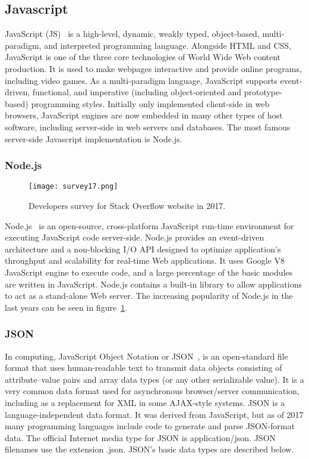 \subsection{Javascript}
JavaScript (JS)~\cite{crockford2008javascript} is a high-level, dynamic, weakly typed, object-based, multi-paradigm, and interpreted programming language. Alongside HTML and CSS, JavaScript is one of the three core technologies of World Wide Web content production. It is used to make webpages interactive and provide online programs, including video games. As a multi-paradigm language, JavaScript supports event-driven, functional, and imperative (including object-oriented and prototype-based) programming styles. Initially only implemented client-side in web browsers, JavaScript engines are now embedded in many other types of host software, including server-side in web servers and databases. The most famous server-side Javascript implementation is Node.js.

\subsubsection{Node.js}
\begin{figure}
	\centerline{\texttt{[image: survey17.png]}}
	\caption{Developers survey for Stack Overflow website in 2017.}
	\label{survey17}
\end{figure}
Node.js~\cite{tilkov2010node} is an open-source, cross-platform JavaScript run-time environment for executing JavaScript code server-side. Node.js provides an event-driven architecture and a non-blocking I/O API designed to optimize application's throughput and scalability for real-time Web applications. It uses Google V8 JavaScript engine to execute code, and a large percentage of the basic modules are written in JavaScript. Node.js contains a built-in library to allow applications to act as a stand-alone Web server. The increasing popularity of Node.js in the last years can be seen in figure~\ref{survey17}.

\subsubsection{JSON}
\label{json}
In computing, JavaScript Object Notation or JSON~\cite{crockford2006application}, is an open-standard file format that uses human-readable text to transmit data objects consisting of attribute–value pairs and array data types (or any other serializable value). It is a very common data format used for asynchronous browser/server communication, including as a replacement for XML in some AJAX-style systems.
JSON is a language-independent data format. It was derived from JavaScript, but as of 2017 many programming languages include code to generate and parse JSON-format data. The official Internet media type for JSON is application/json. JSON filenames use the extension .json. JSON's basic data types are described below. \par
